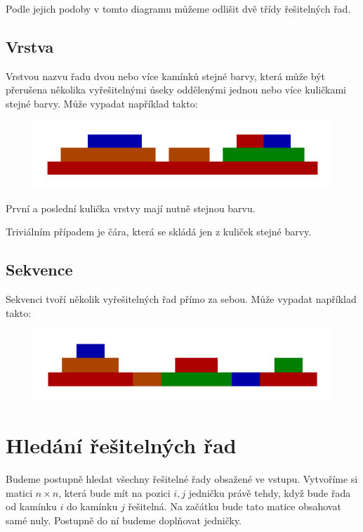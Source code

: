 \documentclass{article}
\begin{document}
Podle jejich podoby v tomto diagramu můžeme odlišit dvě třídy řešitelných řad.

\subsection{Vrstva}

Vrstvou nazvu řadu dvou nebo více kamínků stejné barvy, která může být přerušena několika vyřešitelnými úseky oddělenými jednou nebo více kuličkami stejné barvy. Může vypadat například takto:

\begin{figure}[H]
    \centering
    \includegraphics[scale=1]{layer.pdf}
\end{figure}

První a poslední kulička vrstvy mají nutně stejnou barvu.

Triviálním případem je čára, která se skládá jen z kuliček stejné barvy.

\subsection{Sekvence}

Sekvenci tvoří několik vyřešitelných řad přímo za sebou. Může vypadat například takto:

\begin{figure}[H]
    \centering
    \includegraphics[scale=1]{sequence.pdf}
\end{figure}

\section{Hledání řešitelných řad}
\label{section:search}

Budeme postupně hledat všechny řešitelné řady obsažené ve vstupu. Vytvoříme si matici $n \times n$, která bude mít na pozici $i, j$ jedničku právě tehdy, když bude řada od kamínku $i$ do kamínku $j$ řešitelná. Na začátku bude tato matice obsahovat samé nuly. Postupně do ní budeme doplňovat jedničky.
\end{document}
